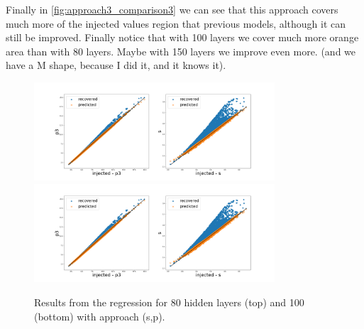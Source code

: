 \documentclass[prd,aps,twocolumn,a4paper,showkeys,nofootinbib]{article}
\begin{document}
Finally in \ref{fig:approach3_comparison3} we can see that this approach covers much more of the injected values region that previous models, although it can still be improved. Finally notice that with 100 layers we cover much more orange area than with 80 layers. Maybe with 150 layers we improve even more. (and we have a M shape, because I did it, and it knows it).

\begin{figure}[]
  \center
  \includegraphics[width=0.8\textwidth]{./Figs/80_resultReg}
  \includegraphics[width=0.8\textwidth]{./Figs/100_resultReg}
  \caption{\label{fig:approach3_comparison1} Results from the regression for 80 hidden layers (top) and 100 (bottom) with approach (s,p).}
\end{figure}
\end{document}
